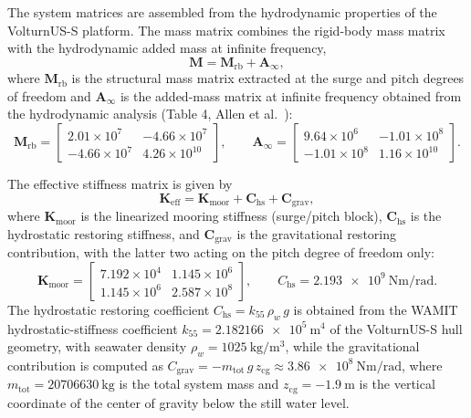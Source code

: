 \documentclass[final,5p,times,twocolumn]{elsarticle}
\begin{document}
The system matrices are assembled from the hydrodynamic properties of the VolturnUS-S platform. The mass matrix combines the rigid-body mass matrix with the hydrodynamic added mass at infinite frequency,
%
\begin{equation}
\label{eq:mass_matrix}
\mathbf{M} = \mathbf{M}_{\mathrm{rb}} + \mathbf{A}_{\infty},
\end{equation}
%
where $\mathbf{M}_{\mathrm{rb}}$ is the structural mass matrix extracted at the surge and pitch degrees of freedom and $\mathbf{A}_{\infty}$ is the added-mass matrix at infinite frequency obtained from the hydrodynamic analysis (Table 4, Allen et al.~\cite{allen2020definition}):
%
\begin{equation}
\mathbf{M}_{\mathrm{rb}} =
\begin{bmatrix}
2.01\times10^{7} & -4.66\times10^{7} \\
-4.66\times10^{7} & 4.26\times10^{10}
\end{bmatrix},
\qquad
\mathbf{A}_{\infty} =
\begin{bmatrix}
9.64\times10^{6} & -1.01\times10^{8} \\
-1.01\times10^{8} & 1.16\times10^{10}
\end{bmatrix}.
\end{equation}

The effective stiffness matrix is given by
%
\begin{equation}
\label{eq:stiff_matrix}
\mathbf{K}_{\mathrm{eff}} = \mathbf{K}_{\mathrm{moor}}
+ \mathbf{C}_{\mathrm{hs}}
+ \mathbf{C}_{\mathrm{grav}},
\end{equation}
%
where $\mathbf{K}_{\mathrm{moor}}$ is the linearized mooring stiffness (surge/pitch block), $\mathbf{C}_{\mathrm{hs}}$ is the hydrostatic restoring stiffness, and $\mathbf{C}_{\mathrm{grav}}$ is the gravitational restoring contribution, with the latter two acting on the pitch degree of freedom only:
%
\begin{equation}
\mathbf{K}_{\mathrm{moor}} =
\begin{bmatrix}
7.192\times10^{4} & 1.145\times10^{6} \\
1.145\times10^{6} & 2.587\times10^{8}
\end{bmatrix},
\qquad
C_{\mathrm{hs}} = \SI{2.193e9}{\newton\metre\per\radian}.
\end{equation}
%
The hydrostatic restoring coefficient $C_{\mathrm{hs}} = k_{55}\,\rho_{w}\,g$ is obtained from the WAMIT hydrostatic-stiffness coefficient $k_{55} = \SI{2.182166e5}{\metre^4}$ of the VolturnUS-S hull geometry, with seawater density $\rho_w = \SI{1025}{\kilo\gram\per\metre\cubed}$, while the gravitational contribution is computed as $C_{\mathrm{grav}} = -m_{\mathrm{tot}}\,g\,z_{\mathrm{cg}} \approx \SI{3.86e8}{\newton\metre\per\radian}$, where $m_{\mathrm{tot}} = \SI{20706630}{\kilo\gram}$ is the total system mass and $z_{\mathrm{cg}} = \SI{-1.9}{\metre}$ is the vertical coordinate of the center of gravity below the still water level.
\end{document}
